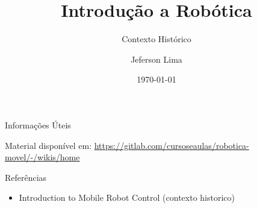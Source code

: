 \documentclass{beamer}
\title{Introdução a Robótica}
\subtitle{Contexto Histórico}
\date{\today}
\author{Jeferson Lima}
\institute{\url{http://gitlab.com/jeferson.lima}}
\begin{document}
\maketitle

\begin{frame}{Informações Úteis}
	\begin{block}{Material disponível em:}
		\href{Robótica Móvel - Wiki}{https://gitlab.com/cursoseaulas/robotica-movel/-/wikis/home}
	\end{block}
\end{frame}


\begin{frame}[t]{Referências}
    \begin{itemize}
        \item Introduction to Mobile Robot Control (contexto historico)
    \end{itemize}
\end{frame}
\end{document}
